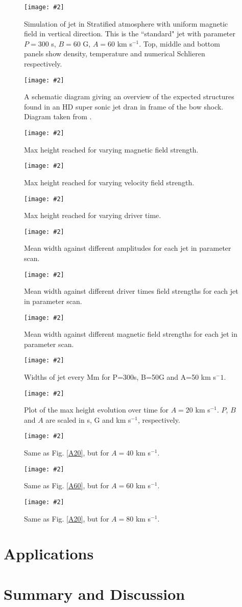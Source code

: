 \documentclass[12pt]{ociamthesis}
\newcommand{\fref}[1]{Fig. \eqref{#1}}
\newcommand{\mfig}[4]{
  \begin{figure}
  \begin{center}
  \texttt{[image: \#2]}
  \caption{#3}
  \label{#4}
  \end{center}
  \end{figure}}
\begin{document}
\mfig{0.8}{figures/jet_P300_B60A_60_t_1_4_7_10.png}{Simulation of jet in Stratified atmosphere with uniform magnetic field in vertical direction. This is the ``standard" jet with parameter $P=300$ s, $B=60$ G, $A=60$ km s$^{-1}$. Top, middle and bottom panels show density, temperature and numerical Schlieren respectively.}{jet_simulation}
\mfig{0.5}{figures/diagram_of_ssj.png}{A schematic diagram giving an overview of the expected structures found in an HD super sonic jet dran in frame of the bow shock. Diagram taken from \cite{Chakrabarti1988}.}{ssj}
\mfig{0.8}{figures/maxhb.png}{Max height reached for varying magnetic field strength.}{max_h_vs_b}
\mfig{0.8}{figures/maxha.png}{Max height reached for varying velocity field strength.}{max_h_vs_a}
\mfig{0.8}{figures/maxhdt.png}{Max height reached for varying driver time.}{max_h_vs_dt}
\mfig{0.8}{figures/mean_w_vs_A.png}{Mean width against different amplitudes for each jet in parameter scan.}{mean_w_vs_A}
\mfig{0.8}{figures/mean_w_vs_P.png}{Mean width against different driver times field strengths for each jet in parameter scan.}{mean_w_vs_dt}
\mfig{0.8}{figures/mean_w_vs_B.png}{Mean width against different magnetic field strengths for each jet in parameter scan.}{mean_w_vs_b}
\mfig{0.8}{figures/P300_B50_A60.png}{Widths of jet every Mm for P=300s, B=50G and A=50 km s$^-1$.}{hight_dt}
\mfig{0.8}{figures/P300_B100_A20.png}{Plot of the max height evolution over time for $A=20$ km s$^{-1}$. $P$, $B$ and $A$ are scaled in s, G and km s$^{-1}$, respectively.}{A20}
\mfig{0.8}{figures/P300_B100_A40.png}{Same as \fref{A20}, but for $A=40$ km s$^{-1}$.}{A40}
\mfig{0.8}{figures/P300_B100_A60.png}{Same as \fref{A60}, but for $A=60$ km s$^{-1}$.}{A20}
\mfig{0.8}{figures/P300_B100_A80.png}{Same as \fref{A20}, but for $A=80$ km s$^{-1}$.}{A80}
\section{Applications}
\label{sec:c2app}


\section{Summary and Discussion}
\label{sec:c2discussion}





\end{document}
